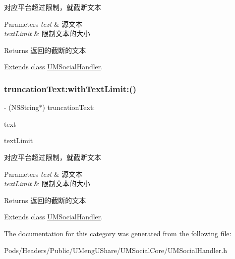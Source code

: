对应平台超过限制，就截断文本


\begin{DoxyParams}{Parameters}
{\em text} & 源文本 \\
\hline
{\em text\+Limit} & 限制文本的大小\\
\hline
\end{DoxyParams}
\begin{DoxyReturn}{Returns}
返回的截断的文本 
\end{DoxyReturn}


Extends class \mbox{\hyperlink{interface_u_m_social_handler_ae19a28003b6af6039dc68c0b465386c0}{U\+M\+Social\+Handler}}.

\mbox{\label{category_u_m_social_handler_07_u_m_social_limit_08_ae19a28003b6af6039dc68c0b465386c0}} 
\subsubsection{\texorpdfstring{truncation\+Text\+:with\+Text\+Limit\+:()}{truncationText:withTextLimit:()}\hspace{0.1cm}{\footnotesize\ttfamily [2/2]}}
{\footnotesize\ttfamily -\/ (N\+S\+String$\ast$) truncation\+Text\+: \begin{DoxyParamCaption}\item[{(N\+S\+String $\ast$)}]{text }\item[{withTextLimit:(N\+S\+U\+Integer)}]{text\+Limit }\end{DoxyParamCaption}}

对应平台超过限制，就截断文本


\begin{DoxyParams}{Parameters}
{\em text} & 源文本 \\
\hline
{\em text\+Limit} & 限制文本的大小\\
\hline
\end{DoxyParams}
\begin{DoxyReturn}{Returns}
返回的截断的文本 
\end{DoxyReturn}


Extends class \mbox{\hyperlink{interface_u_m_social_handler_ae19a28003b6af6039dc68c0b465386c0}{U\+M\+Social\+Handler}}.



The documentation for this category was generated from the following file\+:\begin{DoxyCompactItemize}
\item 
Pods/\+Headers/\+Public/\+U\+Meng\+U\+Share/\+U\+M\+Social\+Core/U\+M\+Social\+Handler.\+h\end{DoxyCompactItemize}
